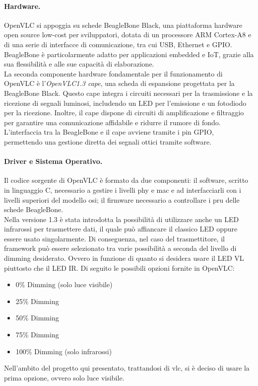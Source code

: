 \paragraph{Hardware.}
OpenVLC si appoggia su schede BeagleBone Black, una piattaforma hardware open source low-cost per sviluppatori, dotata di un processore ARM Cortex-A8 e di una serie di interfacce di comunicazione, tra cui USB, Ethernet e GPIO. BeagleBone è particolarmente adatto per applicazioni embedded e IoT, grazie alla sua flessibilità e alle sue capacità di elaborazione.\\
La seconda componente hardware fondamentale per il funzionamento di OpenVLC è l'\textit{OpenVLC1.3 cape}, una scheda di espansione progettata per la BeagleBone Black. Questo cape integra i circuiti necessari per la trasmissione e la ricezione di segnali luminosi, includendo un LED per l'emissione e un fotodiodo per la ricezione. Inoltre, il cape dispone di circuiti di amplificazione e filtraggio per garantire una comunicazione affidabile e ridurre il rumore di fondo. L'interfaccia tra la BeagleBone e il cape avviene tramite i pin GPIO, permettendo una gestione diretta dei segnali ottici tramite software.

\paragraph{Driver e Sistema Operativo.}
Il codice sorgente di OpenVLC è formato da due componenti: il software, scritto in linguaggio C, necessario a gestire i livelli \gls{phy} e \gls{mac} e ad interfacciarli con i livelli superiori del modello \gls{osi}; il firmware necessario a controllare i \gls{pru} delle schede BeagleBone.\\
Nella versione 1.3 è stata introdotta la possibilità di utilizzare anche un LED infrarossi per trasmettere dati, il quale può affiancare il classico LED oppure essere usato singolarmente.
Di conseguenza, nel caso del trasmettitore, il framework può essere selezionato tra varie possibilità a seconda del livello di dimming desiderato. Ovvero in funzione di quanto si desidera usare il LED VL piuttosto che il LED IR.
Di seguito le possibili opzioni fornite in OpenVLC:
\begin{itemize}
    \item 0\% Dimming (solo luce visibile)
    \item 25\% Dimming
    \item 50\% Dimming
    \item 75\% Dimming
    \item 100\% Dimming (solo infrarossi)
\end{itemize}
Nell'ambito del progetto qui presentato, trattandosi di \gls{vlc}, si è deciso di usare la prima opzione, ovvero solo luce visibile.

